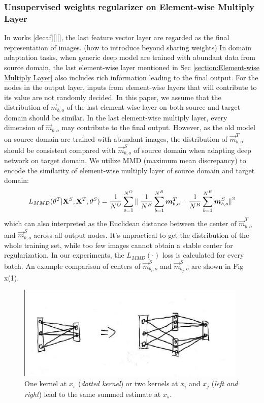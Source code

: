 \documentclass[runningheads]{llncs}
\begin{document}
\subsubsection{Unsupervised weights regularizer on Element-wise Multiply Layer}
In works [decaf][][], the last feature vector layer are regarded as the final representation of images. (how to introduce beyond sharing weights) In domain adaptation tasks, when generic deep model are trained with abundant data from source domain, the last element-wise layer mentioned in Sec \ref{section:Element-wise Multiply Layer} also includes rich information leading to the final output. For the nodes in the output layer, inputs from element-wise layers that will contribute to its value are not randomly decided. In this paper, we assume that the distribution of $\vec{m}_{b,o}$ of the last element-wise layer on both source and target domain should be similar. In the last element-wise multiply layer, every dimension of $\vec{m}_{b,o}$ may contribute to the final output. However, as the old model on source domain are trained with abundant images, the distribution of $\vec{m}^{T}_{b,o}$ should be consistent compared with $\vec{m}^{S}_{b,o}$ of source domain when adapting deep network on target domain. We utilize MMD (maximum mean discrepancy) to encode the similarity of element-wise multiply layer of source domain and target domain:
\begin{equation}\label{equation:LMMD}
  L_{MMD}(\theta^{T}|{\bf X}^{S},{\bf X}^{T},\theta^{S}) = \frac{1}{N^{O}} \sum^{N^{O}}_{o=1}{\parallel \frac{1}{N^{B}}\sum^{N^{B}}_{b=1}{\vec{m}^{T}_{b,o}} - \frac{1}{N^{B}}\sum^{N^{B}}_{b=1}{\vec{m}^{S}_{b,o}} {\parallel}^{2}  }
\end{equation}
which can also interpreted as the Euclidean distance between the center of $\vec{m}^{T}_{b,o}$ and $\vec{m}^{S}_{b,o}$ across all output nodes. It's unpractical to get the distribution of the whole training set, while too few images cannot obtain a stable center for regularization. In our experiments, the $L_{MMD}(\cdot)$ loss is calculated for every batch. An example comparison of centers of $\vec{m}^{S}_{b_{i},o}$ and $\vec{m}^{S}_{b_{j},o}$ are shown in Fig x(1). 

\begin{figure}
\centering
\includegraphics[height=4.5cm]{images/fullconnectlayers.png}
\caption{One kernel at $x_s$ ({\it dotted kernel}) or two kernels at
$x_i$ and $x_j$ ({\it left and right}) lead to the same summed estimate
at $x_s$. }
\label{fig:example}
\end{figure}
\end{document}
